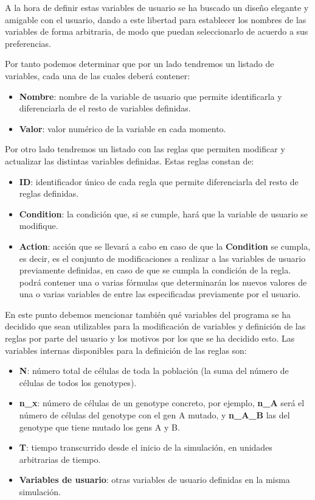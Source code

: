 A la hora de definir estas variables de usuario se ha buscado un diseño elegante y amigable con el usuario, dando a este libertad para establecer los nombres de las variables de forma arbitraria, de modo que puedan seleccionarlo de acuerdo a sus preferencias.

Por tanto podemos determinar que por un lado tendremos un listado de variables, cada una de las cuales deberá contener:
\begin{itemize}
	\item \textbf{Nombre}: nombre de la variable de usuario que permite identificarla y diferenciarla de el resto de variables definidas.
	\item \textbf{Valor}: valor numérico de la variable en cada momento.
\end{itemize}

Por otro lado tendremos un listado con las reglas que permiten modificar y actualizar las distintas variables definidas. Estas reglas constan de:

\begin{itemize}
	\item \textbf{ID}: identificador único de cada regla que permite diferenciarla del resto de reglas definidas.		
	\item \textbf{Condition}: la condición que, si se cumple, hará que la variable de usuario se modifique.
	\item \textbf{Action}: acción que se llevará a cabo en caso de que la \textbf{Condition} se cumpla, es decir, es el conjunto de modificaciones a realizar a las variables de usuario previamente definidas, en caso de que se cumpla la condición de la regla. podrá contener una o varias fórmulas que determinarán los nuevos valores de una o varias variables de entre las especificadas previamente por el usuario.
\end{itemize}

En este punto debemos mencionar también qué variables del programa se ha decidido que sean utilizables para la modificación de variables y definición de las reglas por parte del usuario y los motivos por los que se ha decidido esto. Las variables internas disponibles para la definición de las reglas son:

\begin{itemize}
	\item \textbf{N}: número total de células de toda la población (la suma del número de células de todos los \glspl{genotype}).
	\item \textbf{n\_x}: número de células de un \gls{genotype} concreto, por ejemplo, \textbf{n\_A} será el número de células del \gls{genotype} con el \gls{gen} A mutado, y \textbf{n\_A\_B} las del \gls{genotype} que tiene mutado los \glspl{gen} A y B.
	\item \textbf{T}: tiempo transcurrido desde el inicio de la simulación, en unidades arbitrarias de tiempo.
	\item \textbf{Variables de usuario}: otras variables de usuario definidas en la misma simulación.		
\end{itemize}

